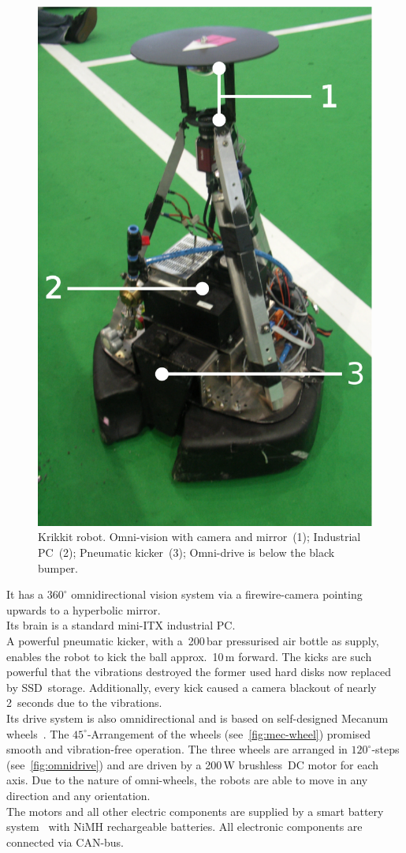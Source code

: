 \documentclass[12pt,a4paper]{article}
\begin{document}
\begin{figure}[htbp]
\begin{center}
\includegraphics[width=0.5\columnwidth]{figures/krikkit.pdf}
\caption{\label{fig:krikkit}
Krikkit robot. Omni-vision with camera and mirror~(1); Industrial PC~(2); Pneumatic kicker~(3); Omni-drive is below the black bumper.
}
\end{center}
\end{figure}

It has a $360^\circ$ omnidirectional vision system via a firewire-camera pointing upwards to a hyperbolic mirror.\\
Its brain is a standard mini-ITX industrial PC.\\
A powerful pneumatic kicker, with a~200\,bar pressurised air bottle as supply, enables the robot to kick the ball approx.\ 10\,m forward.
The kicks are such powerful that the vibrations destroyed the former used hard disks now replaced by SSD~storage.
Additionally, every kick caused a camera blackout of nearly 2~seconds due to the vibrations.\\
Its drive system is also omnidirectional and is based on self-designed Mecanum wheels~\cite{mecanum2007}. 
The $45^\circ$\mbox{-}Arrangement of the wheels (see~\autoref{fig:mec-wheel}) promised smooth and vibration-free operation.
The three wheels are arranged in $120^\circ$\mbox{-}steps (see~\autoref{fig:omnidrive}) and are driven by a 200\,W brushless~DC motor for each axis.
Due to the nature of omni-wheels, the robots are able to move in any direction and any orientation.\\
The motors and all other electric components are supplied by a smart battery system~\cite{krammer06} with NiMH rechargeable batteries.
All electronic components are connected via CAN-bus.
\end{document}
